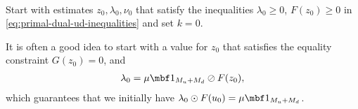 \documentclass[11pt]{article}
\begin{document}
\begin{algorithm}~\label{al:primal-dual}
\begin{steps}
\item Start with estimates $z_0,\lambda_0,\nu_0$ that satisfy the inequalities
  $\lambda_0\ge 0$, $F(z_0)\ge 0$ in \eqref{eq:primal-dual-ud-inequalities} and set $k=0$.

  It is often a good idea to start with a value for $z_0$ that
  satisfies the equality constraint $G(z_0)=0$, and
  \begin{align*}
    \lambda_0=\mu\mbf 1_{M_u+M_d}\oslash F(z_0),
  \end{align*}
  which guarantees that we initially have
  $\lambda_0\odot F(u_0)=\mu\mbf 1_{M_u+M_d}$.



\end{steps}
\end{algorithm}
\end{document}
